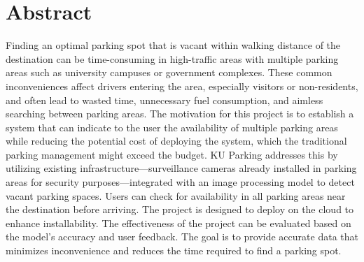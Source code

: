 \chapter*{Abstract}
\label{chap:abstract}

Finding an optimal parking spot that is vacant within walking distance of the destination can be time-consuming in high-traffic areas with multiple parking areas such as university campuses or government complexes.
These common inconveniences affect drivers entering the area, especially visitors or non-residents, and often lead to wasted time, unnecessary fuel consumption, and aimless searching between parking areas. The motivation for this project is to establish a system that can indicate to the user the availability of multiple parking areas while reducing the potential cost of deploying the system, which the traditional parking management might exceed the budget. 
KU Parking addresses this by utilizing existing infrastructure—surveillance cameras already installed in parking areas for security purposes—integrated with an image processing model to detect vacant parking spaces.
Users can check for availability in all parking areas near the destination before arriving.
The project is designed to deploy on the cloud to enhance installability. 
The effectiveness of the project can be evaluated based on the model's accuracy and user feedback.
The goal is to provide accurate data that minimizes inconvenience and reduces the time required to find a parking spot.